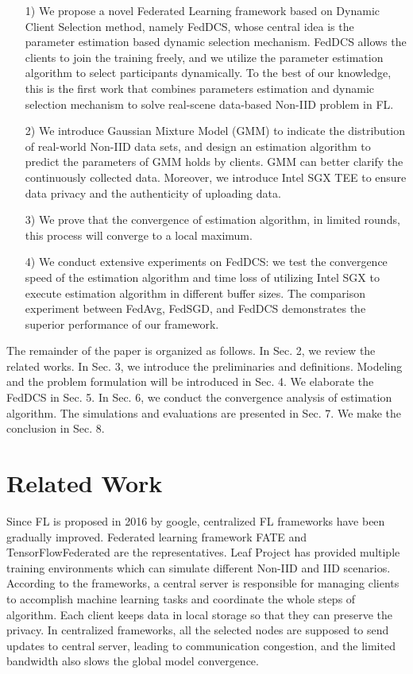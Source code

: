 \documentclass[conference]{IEEEtran}
\begin{document}
\begin{itemize}
    \item [1)]We propose a novel Federated Learning framework based on Dynamic 
    Client Selection method, namely FedDCS, whose central idea is
     the parameter estimation based dynamic selection mechanism.
      FedDCS allows the clients to join the training freely, 
      and we utilize the parameter estimation algorithm to select
       participants dynamically. To the best of our knowledge, this
        is the first work that combines parameters estimation and 
        dynamic selection mechanism to solve real-scene data-based Non-IID problem in FL. 
    \item [2)]We introduce Gaussian Mixture Model (GMM) to indicate 
    the distribution of real-world Non-IID data sets, and design an
     estimation algorithm to predict the parameters of GMM holds by clients.
      GMM can better clarify the continuously collected data. Moreover, 
      we introduce Intel SGX TEE to ensure data privacy and the authenticity of uploading data.
    \item [3)]We prove that the convergence of estimation algorithm,
    in limited rounds, this process will converge to a local maximum.
    \item [4)]We conduct extensive experiments on FedDCS: we test the convergence speed of the estimation algorithm and time loss of utilizing Intel SGX to execute estimation algorithm in different buffer sizes. The comparison experiment between FedAvg, FedSGD, and FedDCS demonstrates the superior performance of our framework.
\end{itemize}
The remainder of the paper is organized as follows. In Sec. 2, we review the related works. In Sec. 3, we introduce the preliminaries and definitions.
Modeling and the problem formulation will be introduced in Sec. 4.
We elaborate the FedDCS in Sec. 5. In Sec. 6, we conduct the convergence analysis of estimation algorithm. The simulations and evaluations are presented in Sec. 7. We make the conclusion in Sec. 8.
\section{Related Work}
Since FL is proposed in 2016 by google, centralized 
FL frameworks have been gradually improved. Federated 
learning framework FATE\cite{yang2019federated1} and TensorFlowFederated\cite{tensorflow2015-whitepaper} are the representatives. Leaf Project \cite{caldas2019leaf}
has provided multiple training environments which can simulate different
Non-IID and IID scenarios. According to the frameworks, a central server
is responsible for managing clients to accomplish machine learning tasks and coordinate the whole steps of 
algorithm. Each client keeps data in local storage
so that they can preserve the privacy. In centralized frameworks, all the selected nodes 
are supposed to send updates to central server, leading to communication 
congestion, and the limited bandwidth also slows the global model convergence.
\end{document}
